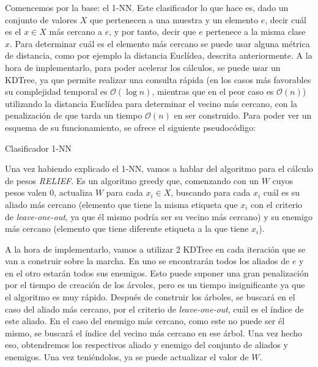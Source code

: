 \documentclass[11pt,a4paper]{article}
\begin{document}
Comencemos por la base: el 1-NN. Este clasificador lo que hace es, dado un conjunto de valores $X$ que pertenecen a 
una muestra y un elemento $e$, decir cuál es el $x \in X$ más cercano a $e$, y por tanto, decir que $e$ pertenece a la
misma clase $x$. Para determinar cuál es el elemento más cercano se puede usar alguna métrica de distancia, como por ejemplo
la distancia Euclídea, descrita anteriormente. A la hora de implementarlo, para poder acelerar los cálculos, se puede usar
un KDTree, ya que permite realizar una consulta rápida (en los casos más favorables su complejidad temporal es $\mathcal{O}
(\log n)$, mientras que en el peor caso es $\mathcal{O}(n)$) utilizando la distancia Euclídea para determinar el vecino más
cercano, con la penalización de que tarda un tiempo $\mathcal{O}(n)$ en ser construido. Para poder ver un esquema de su funcionamiento, se ofrece el siguiente pseudocódigo:

\begin{algorithm}[H]
\caption{Clasificador 1-NN}

\end{algorithm}

Una vez habiendo explicado el 1-NN, vamos a hablar del algoritmo para el cálculo de pesos \textit{RELIEF}. Es un algoritmo
greedy que, comenzando con un $W$ cuyos pesos valen 0, actualiza $W$ para cada $x_i \in X$, buscando para cada $x_i$ cuál es
su aliado más cercano (elemento que tiene la misma etiqueta que $x_i$ con el criterio de \textit{leave-one-out}, ya que él
mismo podría ser su vecino más cercano) y su enemigo más cercano (elemento que tiene diferente etiqueta a la que tiene $x_i$).

A la hora de implementarlo, vamos a utilizar 2 KDTree en cada iteración que se van a construir sobre la marcha. En uno se
encontrarán todos los aliados de $e$ y en el otro estarán todos sus enemigos. Esto puede suponer una gran penalización por el
tiempo de creación de los árvoles, pero es un tiempo insignificante ya que el algoritmo es muy rápido. Después de construir los
árboles, se buscará en el caso del aliado más cercano, por el criterio de \textit{leave-one-out}, cuál es el índice de este
aliado. En el caso del enemigo más cercano, como este no puede ser él mismo, se buscará el índice del vecino más cercano en ese
árbol. Una vez hecho eso, obtendremos los respectivos aliado y enemigo del conjunto de aliados y enemigos. Una vez teniéndolos,
ya se puede actualizar el valor de $W$.
\end{document}
